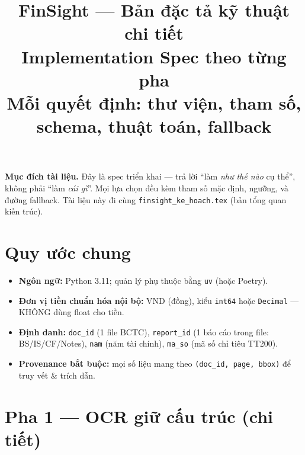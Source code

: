 \documentclass[11pt,a4paper]{article}
\title{\vspace{-1.2cm}\textbf{\color{fsblue}FinSight --- Bản đặc tả kỹ thuật chi tiết}\\[4pt]
\large Implementation Spec theo từng pha\\[5pt]
\normalsize\color{fsgray} Mỗi quyết định: thư viện, tham số, schema, thuật toán, fallback}
\author{}
\date{}
\begin{document}
\maketitle
\thispagestyle{fancy}
\vspace{-0.9cm}

\begin{ghichu}
\textbf{Mục đích tài liệu.} Đây là spec triển khai --- trả lời ``làm \emph{như thế nào} cụ thể'', không phải ``làm \emph{cái gì}''. Mọi lựa chọn đều kèm tham số mặc định, ngưỡng, và đường fallback. Tài liệu này đi cùng \texttt{finsight\_ke\_hoach.tex} (bản tổng quan kiến trúc).
\end{ghichu}

\tableofcontents
\vspace{0.3cm}

\section{Quy ước chung}

\begin{itemize}
  \item \textbf{Ngôn ngữ:} Python 3.11; quản lý phụ thuộc bằng \texttt{uv} (hoặc Poetry).
  \item \textbf{Đơn vị tiền chuẩn hóa nội bộ:} VND (đồng), kiểu \texttt{int64} hoặc \texttt{Decimal} --- KHÔNG dùng float cho tiền.
  \item \textbf{Định danh:} \texttt{doc\_id} (1 file BCTC), \texttt{report\_id} (1 báo cáo trong file: BS/IS/CF/Notes), \texttt{nam} (năm tài chính), \texttt{ma\_so} (mã số chỉ tiêu TT200).
  \item \textbf{Provenance bắt buộc:} mọi số liệu mang theo \texttt{(doc\_id, page, bbox)} để truy vết \& trích dẫn.
\end{itemize}

\section{Pha 1 --- OCR giữ cấu trúc (chi tiết)}
\end{document}
